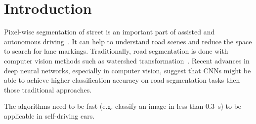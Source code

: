 
\section{Introduction}
Pixel-wise segmentation of street is an important part of assisted and
autonomous driving~\cite{Tarel2009}. It can help to understand road scenes and
reduce the space to search for lane markings. Traditionally, road segmentation
is done with computer vision methods such as watershed
transformation~\cite{Beucher1990}. Recent advances in deep neural networks,
especially in computer vision, suggest that \glspl{CNN} might be able to
achieve higher classification accuracy on road segmentation tasks then those
traditional approaches.

The algorithms need to be fast (e.g. classify an image in less than \SI{0.3}{\second})
to be applicable in self-driving cars.